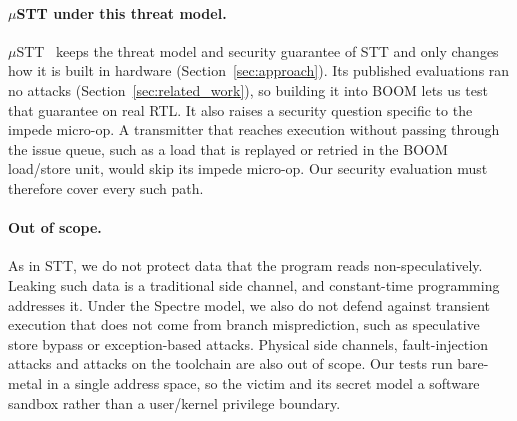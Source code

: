 \paragraph{$\mu$STT under this threat model.}
$\mu$STT~\cite{Chen:uSTT:2025} keeps the threat model and security guarantee of STT and
only changes how it is built in hardware (Section~\ref{sec:approach}). Its published
evaluations ran no attacks (Section~\ref{sec:related_work}), so building it into BOOM
lets us test that guarantee on real RTL. It also raises a security question specific to
the impede micro-op. A transmitter that reaches execution without passing through the
issue queue, such as a load that is replayed or retried in the BOOM load/store unit,
would skip its impede micro-op. Our security evaluation must therefore cover every such
path.

\paragraph{Out of scope.}
As in STT, we do not protect data that the program reads non-speculatively. Leaking
such data is a traditional side channel, and constant-time programming addresses it.
Under the Spectre model, we also do not defend against transient execution that does
not come from branch misprediction, such as speculative store bypass or exception-based
attacks. Physical side channels, fault-injection attacks and attacks on the toolchain
are also out of scope. Our tests run bare-metal in a single address space, so the
victim and its secret model a software sandbox rather than a user/kernel privilege
boundary.
